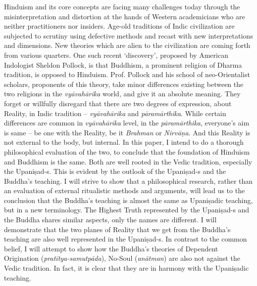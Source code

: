Hinduism and its core concepts are facing many challenges today through the misinterpretation and distortion at the hands of Western academicians who are neither practitioners nor insiders. Age-old traditions of Indic civilization are subjected to scrutiny using defective methods and recast with new interpretations and dimensions. New theories which are alien to the civilization are coming forth from various quarters. One such recent ‘discovery’, proposed by American Indologist Sheldon Pollock, is that Buddhism, a prominent religion of Dharma tradition, is opposed to Hinduism. Prof. Pollock and his school of neo-Orientalist scholars, proponents of this theory, take minor differences existing between the two religions in the \textit{vyāvahārika} world, and give it an absolute meaning. They forget or willfully disregard that there are two degrees of expression, about Reality, in Indic tradition – \textit{vyāvahārika} and \textit{pāramārthika}. While certain differences are common in \textit{vyāvahārika} level, in the \textit{pāramārthika}, everyone’s aim is same – be one with the Reality, be it \textit{Brahman} or \textit{Nirvāṇa}. And this Reality is not external to the body, but internal. In this paper, I intend to do a thorough philosophical evaluation of the two, to conclude that the foundation of Hinduism and Buddhism is the same. Both are well rooted in the Vedic tradition, especially the Upaniṣad-s. This is evident by the outlook of the Upaniṣad-s and the Buddha’s teaching. I will strive to show that a philosophical research, rather than an evaluation of external ritualistic methods and arguments, will lead us to the conclusion that the Buddha’s teaching is almost the same as Upaniṣadic teaching, but in a new terminology. The Highest Truth represented by the Upaniṣad-s and the Buddha shares similar aspects, only the names are different. I will demonstrate that the two planes of Reality that we get from the Buddha’s teaching are also well represented in the Upaniṣad-s. In contrast to the common belief, I will attempt to show how the Buddha’s theories of Dependent Origination (\textit{pratītya-samutpāda}), No-Soul (\textit{anātman}) are also not against the Vedic tradition. In fact, it is clear that they are in harmony with the Upaniṣadic teaching.


